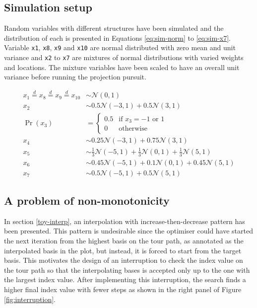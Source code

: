 \documentclass[12pt]{article}
\begin{document}
\hypertarget{simulation-setup}{%
\subsection{Simulation setup}\label{simulation-setup}}

Random variables with different structures have been simulated and the distribution of each is presented in Equations \ref{eq:sim-norm} to \ref{eq:sim-x7}. Variable \texttt{x1}, \texttt{x8}, \texttt{x9} and \texttt{x10} are normal distributed with zero mean and unit variance and \texttt{x2} to \texttt{x7} are mixtures of normal distributions with varied weights and locations. The mixture variables have been scaled to have an overall unit variance before running the projection pursuit.

\begin{align}
x_1 \overset{d}{=} x_8 \overset{d}{=} x_9 \overset{d}{=} x_{10}& \sim \mathcal{N}(0, 1) \label{eq:sim-norm} \\
x_2 &\sim 0.5 \mathcal{N}(-3, 1) + 0.5 \mathcal{N}(3, 1)\label{eq:sim-x2}\\
\Pr(x_3) &= 
\begin{cases}
0.5 & \text{if $x_3 = -1$ or $1$}\\
0 & \text{otherwise}
\end{cases}\label{eq:sim-x3}\\
x_4 &\sim 0.25 \mathcal{N}(-3, 1) + 0.75 \mathcal{N}(3, 1) \label{eq:sim-x4}\\
x_5 &\sim \frac{1}{3} \mathcal{N}(-5, 1) + \frac{1}{3} \mathcal{N}(0, 1) + \frac{1}{3} \mathcal{N}(5, 1)\label{eq:sim-x5}\\
x_6 &\sim 0.45 \mathcal{N}(-5, 1) + 0.1 \mathcal{N}(0, 1) + 0.45 \mathcal{N}(5, 1)\label{eq:sim-x6}\\
x_7 &\sim 0.5 \mathcal{N}(-5, 1) + 0.5 \mathcal{N}(5, 1) 
\label{eq:sim-x7}
\end{align}

\hypertarget{monotonic}{%
\subsection{A problem of non-monotonicity}\label{monotonic}}

In section \ref{toy-interp}, an interpolation with increase-then-decrease pattern has been presented. This pattern is undesirable since the optimiser could have started the next iteration from the highest basis on the tour path, as annotated as the interpolated basis in the plot, but instead, it is forced to start from the target basis. This motivates the design of an interruption to check the index value on the tour path so that the interpolating bases is accepted only up to the one with the largest index value. After implementing this interruption, the search finds a higher final index value with fewer steps as shown in the right panel of Figure \ref{fig:interruption}.
\end{document}
